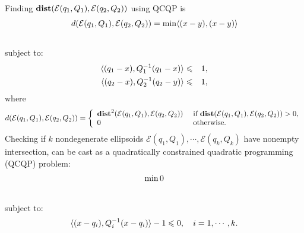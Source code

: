 \documentclass[letterpaper,10pt,english]{sphinxmanual}
\begin{document}
Finding ${\bf dist}({\mathcal E}(q_1,Q_1),{\mathcal E}(q_2,Q_2))$
using QCQP is
\begin{gather}
\begin{split}d({\mathcal E}(q_1,Q_1),{\mathcal E}(q_2,Q_2)) = \min \langle (x-y), (x-y)\rangle\end{split}\notag\\\begin{split}\end{split}\notag
\end{gather}
subject to:
\begin{gather}
\begin{split}\begin{aligned}
\langle (q_1-x), Q_1^{-1}(q_1-x)\rangle & \leqslant& 1,\\
\langle (q_2-x), Q_2^{-1}(q_2-y)\rangle & \leqslant& 1,\end{aligned}\end{split}\notag
\end{gather}
where
\begin{gather}
\begin{split}d({\mathcal E}(q_1,Q_1),{\mathcal E}(q_2,Q_2))=\left\{\begin{array}{ll}
{\bf dist}^2({\mathcal E}(q_1,Q_1),{\mathcal E}(q_2,Q_2)) &
\mbox{ if } {\bf dist}({\mathcal E}(q_1,Q_1),{\mathcal E}(q_2,Q_2))>0, \\
0 & \mbox{ otherwise}. \end{array}\right.\end{split}\notag
\end{gather}
Checking if $k$ nondegenerate ellipsoids
${\mathcal E}(q_1,Q_1),\cdots,{\mathcal E}(q_k,Q_k)$ have nonempty
intersection, can be cast as a quadratically constrained quadratic
programming (QCQP) problem:
\begin{gather}
\begin{split}\min 0\end{split}\notag\\\begin{split}\end{split}\notag
\end{gather}
subject to:
\begin{gather}
\begin{split}\langle (x-q_i),Q_i^{-1}(x-q_i)\rangle - 1 \leqslant0, ~~~ i=1,\cdots,k.\end{split}\notag\\\begin{split}\end{split}\notag
\end{gather}
\end{document}
